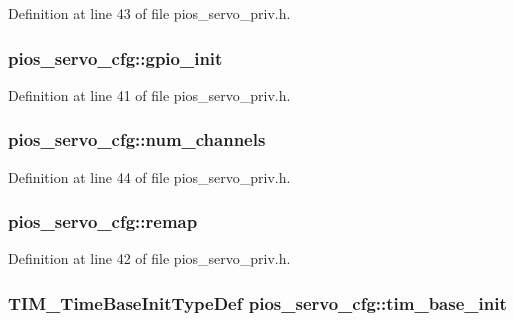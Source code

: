 Definition at line 43 of file pios\-\_\-servo\-\_\-priv.\-h.

\hypertarget{structpios__servo__cfg_a41b9d93e4e94a3a0c5e40a4e42c6d117}{
\subsubsection[{gpio\-\_\-init}]{ pios\-\_\-servo\-\_\-cfg\-::gpio\-\_\-init}}\label{structpios__servo__cfg_a41b9d93e4e94a3a0c5e40a4e42c6d117}


Definition at line 41 of file pios\-\_\-servo\-\_\-priv.\-h.

\hypertarget{structpios__servo__cfg_a94528872c23ad53d65dfb81ab86790fd}{
\subsubsection[{num\-\_\-channels}]{ pios\-\_\-servo\-\_\-cfg\-::num\-\_\-channels}}\label{structpios__servo__cfg_a94528872c23ad53d65dfb81ab86790fd}


Definition at line 44 of file pios\-\_\-servo\-\_\-priv.\-h.

\hypertarget{structpios__servo__cfg_a01880688c4a5e40c514d26c4d64e5efe}{
\subsubsection[{remap}]{ pios\-\_\-servo\-\_\-cfg\-::remap}}\label{structpios__servo__cfg_a01880688c4a5e40c514d26c4d64e5efe}


Definition at line 42 of file pios\-\_\-servo\-\_\-priv.\-h.

\hypertarget{structpios__servo__cfg_afd81686ed67be0c809afa058df95ad44}{
\subsubsection[{tim\-\_\-base\-\_\-init}]{\setlength{\rightskip}{0pt plus 5cm}T\-I\-M\-\_\-\-Time\-Base\-Init\-Type\-Def pios\-\_\-servo\-\_\-cfg\-::tim\-\_\-base\-\_\-init}}\label{structpios__servo__cfg_afd81686ed67be0c809afa058df95ad44}


